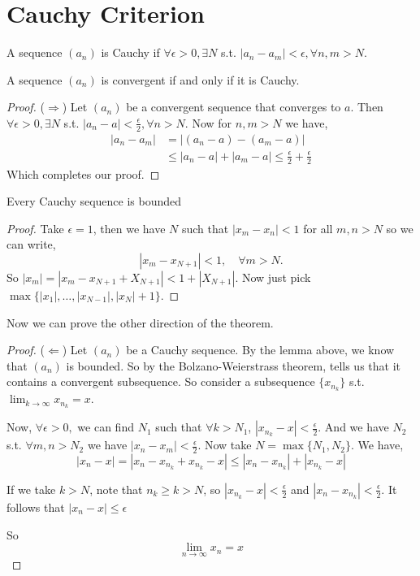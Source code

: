 \section{Cauchy Criterion}
\begin{definition}
	A sequence $(a_n)$ is Cauchy if $\forall \epsilon > 0, \exists N$ s.t. $|a_n - a_m| < \epsilon, \forall n, m > N$.
\end{definition}

\begin{theorem}
    A sequence $(a_n)$ is convergent if and only if it is Cauchy.
\end{theorem}
\begin{proof}
	($\Rightarrow$) Let $(a_n)$ be a convergent sequence that converges to $a$. Then $\forall \epsilon > 0, \exists N$ s.t. $|a_n - a| < \frac{\epsilon}{2}, \forall n > N$. Now for $n, m > N$ we have,
	\begin{align*}
		|a_n - a_m| &= |(a_n - a) - (a_m - a)|\\
			    &\le |a_n - a| + |a_m - a| \le \frac{\epsilon}{2} + \frac{\epsilon}{2} 
	\end{align*}
	Which completes our proof.
\end{proof}

\begin{lemma}
Every Cauchy sequence is bounded
\end{lemma} 
\begin{proof}
	Take $\epsilon = 1$, then we have $N$ such that $|x_m - x_n| < 1$ for all $m, n > N$ so we can write, 
	\[ 
		|x_m - x_{N + 1}| < 1, \quad \forall m > N
	.\]
	So $|x_m| = |x_m - x_{N + 1} + X_{N + 1}| < 1 + |X_{N + 1}|$. Now just pick $\max\{|x_1|, \dots, |x_{N - 1}|, |x_N| + 1\}$.
\end{proof}

Now we can prove the other direction of the theorem.

\begin{proof}
	($\Leftarrow$) Let $(a_n)$ be a Cauchy sequence. By the lemma above, we know that $(a_n)$ is bounded. So by the Bolzano-Weierstrass theorem, tells us that it contains a convergent subsequence. So consider a subsequence $\{x_n_k\} $ s.t. $\lim_{k \to \infty} x_n_k = x$.

	\vspace{1em}
	
	Now, $\forall \epsilon > 0,$ we can find $N_1$ such that $\forall k > N_1$, $|x_n_k - x| < \frac{\epsilon}{2}$. And we have $N_2$ s.t. $\forall m,n > N_2$ we have $|x_n - x_m| < \frac{\epsilon}{2}$. Now take $N = \max \{N_1, N_2\}$. We have, 
	$$ |x_n - x| = |x_n - x_n_k + x_n_k - x| \le |x_n - x_n_k| + |x_n_k - x| $$ 

	If we take $k > N$, note that  $n_k \ge k > N$, so  $|x_n_k - x| < \frac{\epsilon}{2}$ and $|x_n - x_n_k| < \frac{\epsilon}{2}$. It follows that $|x_n - x| \le \epsilon$

	\vspace{1em}

	So $$\lim_{n \to \infty} x_n = x$$

\end{proof}

